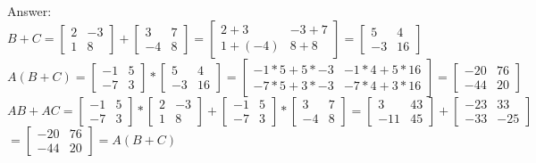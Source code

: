 \documentclass{article}%
\begin{document}
\begin{enumerate}
    Answer: $B + C = \begin{bmatrix} 2 & -3 \\ 1 & 8 \end{bmatrix} + \begin{bmatrix} 3 & 7 \\ -4 & 8 \end{bmatrix} = \begin{bmatrix} 2 + 3 & -3 + 7 \\ 1 + (-4) & 8 + 8\end{bmatrix} = \begin{bmatrix} 5 & 4 \\ -3 & 16\end{bmatrix}$ \\
    $A(B+C) = \begin{bmatrix} -1 & 5 \\ -7 & 3 \end{bmatrix} * \begin{bmatrix} 5 & 4 \\ -3 & 16 \end{bmatrix} = \begin{bmatrix} -1 * 5 + 5 * -3 & -1 * 4 + 5 * 16 \\ -7 * 5 + 3 * -3 & -7 * 4 + 3 * 16 \end{bmatrix} = \begin{bmatrix} -20 & 76 \\ -44 & 20 \end{bmatrix}$ \\
    $AB + AC = \begin{bmatrix}  -1 & 5 \\ -7 & 3\end{bmatrix} * \begin{bmatrix}  2 & -3 \\ 1 & 8\end{bmatrix} + \begin{bmatrix}  -1 & 5 \\ -7 & 3\end{bmatrix} * \begin{bmatrix}  3 & 7 \\ -4 & 8\end{bmatrix} = \begin{bmatrix} 3 & 43 \\ -11 & 45 \end{bmatrix} + \begin{bmatrix} -23 & 33 \\ -33 & -25 \end{bmatrix}$ \\
    $= \begin{bmatrix} -20 & 76 \\ -44 & 20 \end{bmatrix} = A(B+C)$




\end{enumerate}
\end{document}
